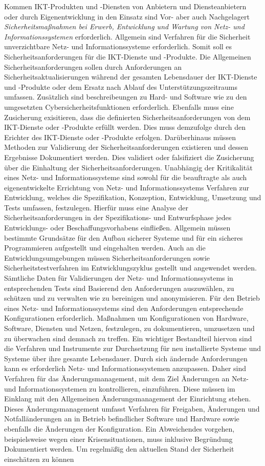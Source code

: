 \documentclass[11pt,a4paper,hidelinks]{article}   %
\begin{document}
                Kommen IKT-Produkten und -Diensten von Anbietern und Diensteanbietern oder durch Eigenentwicklung in den Einsatz sind Vor- aber auch Nachgelagert \emph{Sicherheitsmaßnahmen bei Erwerb, Entwicklung und Wartung von Netz- und Informationssystemen} erforderlich. Allgemein sind Verfahren für die Sicherheit unverzichtbare Netz- und Informationssysteme erforderlich. Somit soll es Sicherheitsanforderungen für die IKT-Dienste und -Produkte. Die Allgemeinen Sicherheitsanforderungen sollen durch Anforderungen an Sicherheitsaktualisierungen während der gesamten Lebensdauer der IKT-Dienste und -Produkte oder dem Ersatz nach Ablauf des Unterstützungszeitraums umfassen. Zusätzlich sind beschreibeungen zu Hard- und Software wie zu den umgesetzten Cybersicherheitsfunktionen erforderlich. Ebenfalls muss eine Zusicherung exisitieren, dass die definierten Sicherheitsanforderungen von dem IKT-Dienste oder -Produkte erfüllt werden. Dies muss demzufolge durch den Erichter des IKT-Dienste oder -Produkte erfolgen. Darüberhinaus müssen Methoden zur Validierung der Sicherheitsanforderungen existieren und dessen Ergebnisse Dokumentiert werden. Dies validiert oder falsifiziert die Zusicherung über die Einhaltung der Sicherheitsanforderungen. Unabhängig der Kritikalität eines Netz- und Informationssysteme sind sowohl für die beauftragte als auch eigenentwickelte Errichtung von Netz- und Informationssystems Verfahren zur Entwicklung, welches die Spezifikation, Konzeption, Entwicklung, Umsetzung und Tests umfassen, festzulegen. Hierfür muss eine Analyse der Sicherheitsanforderungen in der Spezifikations- und Entwurfsphase jedes Entwicklungs- oder Beschaffungsvorhabens einfließen. Allgemein müssen bestimmte Grundsätze für den Aufbau sicherer Systeme und für ein sicheres Programmieren aufgestellt und eingehalten werden. Auch an die Entwicklungsumgebungen müssen Sicherheitsanforderungen sowie Sicherheitstestverfahren im Entwicklungszyklus gestellt und angewendet werden. Sämtliche Daten für Validierungen der Netz- und Informationssystems in entsprechenden Tests sind Basierend den Anforderungen auszuwählen, zu schützen und zu verwalten wie zu bereinigen und anonymisieren. Für den Betrieb eines Netz- und Informationssystems sind den Anforderungen entsprechende Konfigurationen erforderlich. Maßnahmen um Konfigurationen von Hardware, Software, Diensten und Netzen, festzulegen, zu dokumentieren, umzusetzen und zu überwachen sind demnach zu treffen. Ein wichtiger Bestandteil hiervon sind die Verfahren und Instrumente zur Durchsetzung für neu installierte Systeme und Systeme über ihre gesamte Lebensdauer. Durch sich ändernde Anforderungen kann es erforderlich Netz- und Informationssystemen anzupassen. Daher sind Verfahren für das Änderungsmanagement, mit dem Ziel Änderungen an Netz- und Informationssystemen zu kontrollieren, einzuführen. Diese müssen im Einklang mit den Allgemeinen Änderungsmanagement der Einrichtung stehen. Dieses Änderungsmanagement umfasst Verfahren für Freigaben, Änderungen und Notfalländerungen an in Betrieb befindlicher Software und Hardware sowie ebenfalls die Änderungen der Konfiguration. Ein Abweichendes vorgehen, beispielsweise wegen einer Krisensituationen, muss inklusive Begründung Dokumentiert werden. Um regelmäßig den aktuellen Stand der Sicherheit einschätzen zu können 
\end{document}
